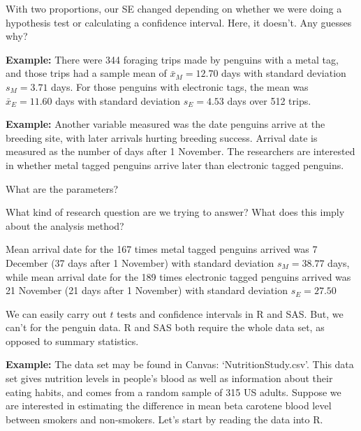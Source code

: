 \documentclass[
  letterpaper,
  DIV=11,
  numbers=noendperiod]{scrartcl}
\begin{document}
With two proportions, our SE changed depending on whether we were doing
a hypothesis test or calculating a confidence interval. Here, it
doesn't. Any guesses why?

\hfill\break
\hfill\break
\hfill\break

\textbf{Example:} There were 344 foraging trips made by penguins with a
metal tag, and those trips had a sample mean of \(\bar x_{M} =12.70\)
days with standard deviation \(s_{M}=3.71\) days. For those penguins
with electronic tags, the mean was \(\bar x_{E} = 11.60\) days with
standard deviation \(s_{E}=4.53\) days over 512 trips.

\hfill\break
\hfill\break
\hfill\break
\hfill\break
\hfill\break
\hfill\break
\hfill\break
\hfill\break

\newpage

\textbf{Example:} Another variable measured was the date penguins arrive
at the breeding site, with later arrivals hurting breeding success.
Arrival date is measured as the number of days after 1 November. The
researchers are interested in whether metal tagged penguins arrive later
than electronic tagged penguins.

What are the parameters?

\hfill\break
\hfill\break
\hfill\break

What kind of research question are we trying to answer? What does this
imply about the analysis method?

\hfill\break
\hfill\break
\hfill\break
\hfill\break
\hfill\break
\hfill\break
\hfill\break

Mean arrival date for the 167 times metal tagged penguins arrived was 7
December (37 days after 1 November) with standard deviation
\(s_{M}=38.77\) days, while mean arrival date for the 189 times
electronic tagged penguins arrived was 21 November (21 days after 1
November) with standard deviation \(s_{E}=27.50\)

\hfill\break
\hfill\break
\hfill\break
\hfill\break
\hfill\break
\hfill\break
\hfill\break
\hfill\break

\newpage

We can easily carry out \(t\) tests and confidence intervals in R and
SAS. But, we can't for the penguin data. R and SAS both require the
whole data set, as opposed to summary statistics.

\textbf{Example:} The data set may be found in Canvas:
`NutritionStudy.csv'. This data set gives nutrition levels in people's
blood as well as information about their eating habits, and comes from a
random sample of 315 US adults. Suppose we are interested in estimating
the difference in mean beta carotene blood level between smokers and
non-smokers. Let's start by reading the data into R.
\end{document}
